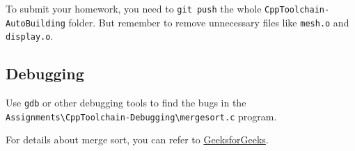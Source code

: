 \documentclass[english]{../TexTemplate/thesis}
\begin{document}
\bigskip
To submit your homework, you need to \verb'git push' the whole \verb'CppToolchain-AutoBuilding' folder.
But remember to remove unnecessary files like \verb'mesh.o' and \verb'display.o'.

\subsection{Debugging}
Use \verb'gdb' or other debugging tools to find the bugs in the\\
\verb'Assignments\CppToolchain-Debugging\mergesort.c' program.

For details about merge sort, you can refer to \href{https://www.geeksforgeeks.org/merge-sort/}{GeeksforGeeks}.
\end{document}
